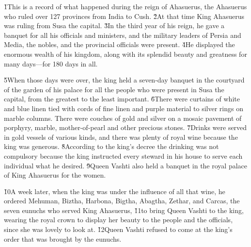 


\v{1}This is a record of what happened during the reign of Ahasuerus, the Ahasuerus who ruled over 127 provinces from India to Cush. \v{2}At that time King Ahasuerus was ruling from Susa the capital. \v{3}In the third year of his reign, he gave a banquet for all his officials and ministers, and the military leaders of Persia and Media, the nobles, and the provincial officials were present. \v{4}He displayed the enormous wealth of his kingdom, along with its splendid beauty and greatness for many days---for 180 days in all.

\v{5}When those days were over, the king held a seven-day banquet in the courtyard of the garden of his palace for all the people who were present in Susa the capital, from the greatest to the least important. \v{6}There were curtains of white and blue linen tied with cords of fine linen and purple material to silver rings on marble columns. There were couches of gold and silver on a mosaic pavement of porphyry, marble, mother-of-pearl and other precious stones. \v{7}Drinks were served in gold vessels of various kinds, and there was plenty of royal wine because the king was generous. \v{8}According to the king's decree the drinking was not compulsory because the king instructed every steward in his house to serve each individual what he desired. \v{9}Queen Vashti also held a banquet in the royal palace of King Ahasuerus for the women.

\v{10}A week later, when the king was under the influence of all that wine, he ordered Mehuman, Biztha, Harbona, Bigtha, Abagtha, Zethar, and Carcas, the seven eunuchs who served King Ahasuerus, \v{11}to bring Queen Vashti to the king, wearing the royal crown to display her beauty to the people and the officials, since she was lovely to look at. \v{12}Queen Vashti refused to come at the king's order that was brought by the eunuchs.

